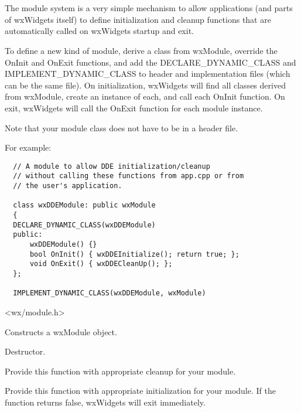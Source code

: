 \section{}\label{wxmodule}

The module system is a very simple mechanism to allow applications (and parts of wxWidgets itself) to
define initialization and cleanup functions that are automatically called on wxWidgets
startup and exit.

To define a new kind of module, derive a class from wxModule, override the OnInit and OnExit functions,
and add the DECLARE\_DYNAMIC\_CLASS and IMPLEMENT\_DYNAMIC\_CLASS to header and implementation files
(which can be the same file). On initialization, wxWidgets will find all classes derived from wxModule,
create an instance of each, and call each OnInit function. On exit, wxWidgets will call the OnExit
function for each module instance.

Note that your module class does not have to be in a header file.

For example:

\begin{verbatim}
  // A module to allow DDE initialization/cleanup
  // without calling these functions from app.cpp or from
  // the user's application.

  class wxDDEModule: public wxModule
  {
  DECLARE_DYNAMIC_CLASS(wxDDEModule)
  public:
      wxDDEModule() {}
      bool OnInit() { wxDDEInitialize(); return true; };
      void OnExit() { wxDDECleanUp(); };
  };

  IMPLEMENT_DYNAMIC_CLASS(wxDDEModule, wxModule)
\end{verbatim}




<wx/module.h>


\label{wxmodulector}


Constructs a wxModule object.

\label{wxmoduledtor}


Destructor.

\label{wxmoduleonexit}


Provide this function with appropriate cleanup for your module.

\label{wxmoduleoninit}


Provide this function with appropriate initialization for your module. If the function
returns false, wxWidgets will exit immediately.


